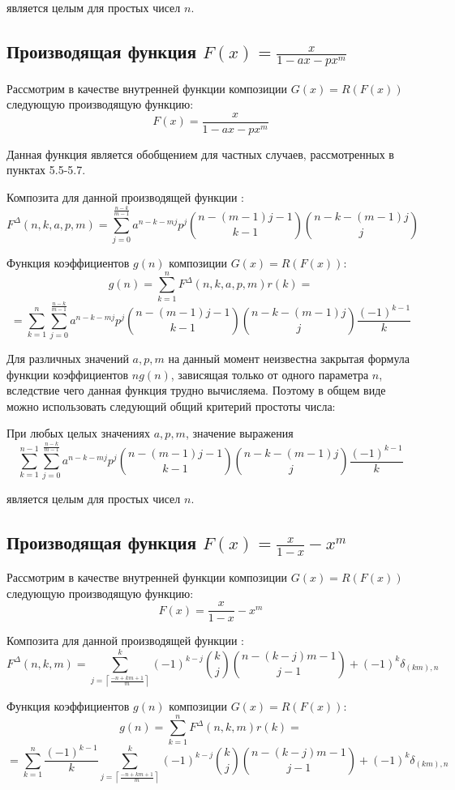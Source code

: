 \documentclass[
russian,
cp1251,
14pt,
simple
]{eskdtext}
\theoremstyle{definition}
\begin{document}
является целым для простых чисел $n$.

\subsection{Производящая функция $F(x)=\frac{x}{1- a x - p x^m}$}
Рассмотрим в качестве внутренней функции композиции $G(x)=R(F(x))$ следующую производящую функцию:
$$
F(x)=\frac{x}{1 - a x - p x^m}
$$

Данная функция является обобщением для частных случаев, рассмотренных в пунктах 5.5-5.7.

Композита для данной производящей функции \cite{KruchininVV}:
$$
F^\Delta(n,k,a,p,m)=\sum_{j=0}^{\frac{n-k}{m-1}}{a^{n-k-m j} p^{j} {n-(m-1)j-1 \choose k-1} {n-k-(m-1)j \choose j}}
$$

Функция коэффициентов $g(n)$ композиции $G(x)=R(F(x))$:
$$
g(n)=\sum_{k=1}^{n}{F^\Delta(n,k,a,p,m) r(k)}=
$$
$$
=\sum_{k=1}^{n}{\sum_{j=0}^{\frac{n-k}{m-1}}{a^{n-k-m j} p^{j} {n-(m-1)j-1 \choose k-1} {n-k-(m-1)j \choose j} \frac{(-1)^{k-1}}{k}}}
$$

Для различных значений $a, p, m$ на данный момент неизвестна закрытая формула функции коэффициентов $ng(n)$, зависящая только от одного параметра $n$, вследствие чего данная функция трудно вычисляема. Поэтому в общем виде можно использовать следующий общий критерий простоты числа:

При любых целых значениях $a, p, m$, значение выражения
$$
\sum_{k=1}^{n-1}{\sum_{j=0}^{\frac{n-k}{m-1}}{a^{n-k-m j} p^{j} {n-(m-1)j-1 \choose k-1} {n-k-(m-1)j \choose j} \frac{(-1)^{k-1}}{k}}}
$$

является целым для простых чисел $n$.

\subsection{Производящая функция $F(x)=\frac{x}{1-x}-x^m$}
Рассмотрим в качестве внутренней функции композиции $G(x)=R(F(x))$ следующую производящую функцию:
$$
F(x)=\frac{x}{1 - x} - x^m
$$

Композита для данной производящей функции \cite{KruchininVV}:
$$
F^\Delta(n,k,m)=\sum\limits _{j=\left\lceil\frac{-n + km + 1}{m}\right\rceil}^{k}(-1)^{k - j} {k \choose j}{n - (k - j)m - 1 \choose j - 1} + (-1)^k \delta_{\left(km\right),n}
$$

Функция коэффициентов $g(n)$ композиции $G(x)=R(F(x))$:
$$
g(n)=\sum\limits _{k=1}^{n}{F^\Delta(n,k,m)r(k)}=
$$
$$
=\sum\limits _{k=1}^{n} \frac{(-1)^{k-1}}{k}  \sum\limits _{j=\left\lceil\frac{-n + km + 1}{m}\right\rceil}^{k} (-1)^{k - j} {k \choose j}{n - (k - j)m - 1 \choose j - 1} + (-1)^k \delta_{\left(km\right),n} 
$$
\end{document}
